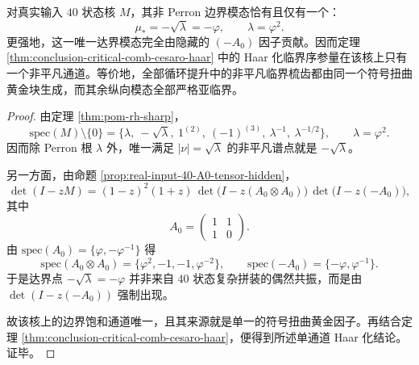 \begin{theorem}[40 状态核的单通道饱和刚性]\label{thm:conclusion-realinput40-single-channel-comb-rigidity}
对真实输入 \(40\) 状态核 \(M\)，其非 Perron 边界模态恰有且仅有一个：
\[
\mu_\ast=-\sqrt{\lambda}=-\varphi,
\qquad
\lambda=\varphi^2.
\]
更强地，这一唯一达界模态完全由隐藏的 \((-A_0)\) 因子贡献。因而定理 \ref{thm:conclusion-critical-comb-cesaro-haar} 中的 Haar 化临界序参量在该核上只有一个非平凡通道。等价地，全部循环提升中的非平凡临界梳齿都由同一个符号扭曲黄金块生成，而其余纵向模态全部严格亚临界。
\end{theorem}
\begin{proof}
由定理 \ref{thm:pom-rh-sharp}，
\[
\mathrm{spec}(M)\setminus\{0\}
=
\{\lambda,\ -\sqrt{\lambda},\ 1^{(2)},\ (-1)^{(3)},\ \lambda^{-1},\ \lambda^{-1/2}\},
\qquad
\lambda=\varphi^2.
\]
因而除 Perron 根 \(\lambda\) 外，唯一满足 \(|\nu|=\sqrt{\lambda}\) 的非平凡谱点就是 \(-\sqrt{\lambda}\)。

另一方面，由命题 \ref{prop:real-input-40-A0-tensor-hidden}，
\[
\det(I-zM)
=(1-z)^2(1+z)\,
\det\!\bigl(I-z(A_0\otimes A_0)\bigr)\,
\det\!\bigl(I-z(-A_0)\bigr),
\]
其中
\[
A_0=
\begin{pmatrix}
1&1\\
1&0
\end{pmatrix}.
\]
由 \(\mathrm{spec}(A_0)=\{\varphi,-\varphi^{-1}\}\) 得
\[
\mathrm{spec}(A_0\otimes A_0)=\{\varphi^2,-1,-1,\varphi^{-2}\},
\qquad
\mathrm{spec}(-A_0)=\{-\varphi,\varphi^{-1}\}.
\]
于是达界点 \(-\sqrt{\lambda}=-\varphi\) 并非来自 \(40\) 状态复杂拼装的偶然共振，而是由 \(\det(I-z(-A_0))\) 强制出现。

故该核上的边界饱和通道唯一，且其来源就是单一的符号扭曲黄金因子。再结合定理 \ref{thm:conclusion-critical-comb-cesaro-haar}，便得到所述单通道 Haar 化结论。证毕。
\end{proof}

